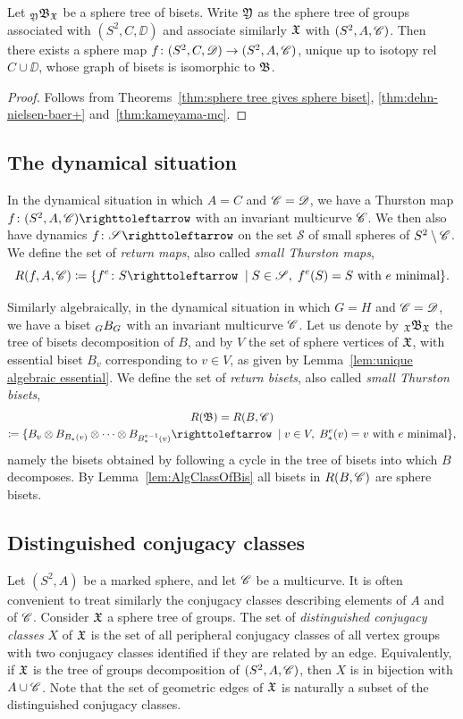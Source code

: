 \documentclass{amsart}
\begin{document}
\begin{cor}\label{cor:dehn-nielsen-baer+-mc}
  Let $\subscript\gfY\gfB_\gf$ be a sphere tree of
  bisets. Write ${\mathfrak Y}$ as the sphere tree of groups associated
  with $(S^2,C,\DD)$ and associate similarly ${\mathfrak X}$ with
  $(S^2,A,{\mathscr C})$. Then there exists a sphere map
  $f\colon(S^2,C,{\mathscr D})\to(S^2,A,{\mathscr C})$, unique up to isotopy rel
  $C\cup\DD$, whose graph of bisets is isomorphic to ${\mathfrak B}$.
\end{cor}
\begin{proof}
  Follows from Theorems~\ref{thm:sphere tree gives sphere biset},
  \ref{thm:dehn-nielsen-baer+} and~\ref{thm:kameyama-mc}.
\end{proof}

\subsection{The dynamical situation}\label{ss:return maps}
In the dynamical situation in which $A=C$ and ${\mathscr C}={\mathscr D}$, we have a
Thurston map $f\colon(S^2,A,\CC)\selfmap$ with an invariant multicurve
${\mathscr C}$. We then also have dynamics $f\colon\mathscr S\selfmap$ on the
set $\mathscr S$ of small spheres of $S^2\setminus{\mathscr C}$. We define the
set of \emph{return maps}, also called \emph{small Thurston maps},
\[R(f,A,\CC)\coloneqq\{f^e\colon S\selfmap\;\mid S\in\mathscr S,\;f^e(S)=S\text{ with $e$ minimal}\}.\]

Similarly algebraically, in the dynamical situation in which $G=H$ and
${\mathscr C}={\mathscr D}$, we have a biset $\subscript G B_G$ with an invariant multicurve
${\mathscr C}$. Let us denote by $\subscript\gf\gfB_\gf$ the tree of bisets
decomposition of $B$, and by $V$ the set of sphere vertices of ${\mathfrak X}$,
with essential biset $B_v$ corresponding to $v\in V$, as given by
Lemma~\ref{lem:unique algebraic essential}. We define the set of
\emph{return bisets}, also called \emph{small Thurston bisets},
\begin{multline}\label{eq:def:SmallThBis}
  R(\gfB)= R(B,\CC)\\
  \coloneqq \{B_v\otimes B_{B_*(v)}\otimes\cdots\otimes
  B_{B_*^{e-1}(v)}\selfmap\;\mid v\in V,\;B_*^e(v)=v\text{ with $e$ minimal}\},
\end{multline}
namely the bisets obtained by following a cycle in the tree of bisets
into which $B$ decomposes. By Lemma~\ref{lem:AlgClassOfBis} all bisets
in $R(B,{\mathscr C})$ are sphere bisets.

\subsection{Distinguished conjugacy classes}\label{ss:distinguished cc}
Let $(S^2,A)$ be a marked sphere, and let ${\mathscr C}$ be a multicurve. It is
often convenient to treat similarly the conjugacy classes describing
elements of $A$ and of ${\mathscr C}$. Consider ${\mathfrak X}$ a sphere tree of
groups. The set of \emph{distinguished conjugacy classes} $X$ of ${\mathfrak X}$
is the set of all peripheral conjugacy classes of all vertex groups
with two conjugacy classes identified if they are related by an
edge. Equivalently, if ${\mathfrak X}$ is the tree of groups decomposition of
$(S^2,A,{\mathscr C})$, then $X$ is in bijection with $A\cup {\mathscr C}$. Note that
the set of geometric edges of ${\mathfrak X}$ is naturally a subset of the
distinguished conjugacy classes.
\end{document}
